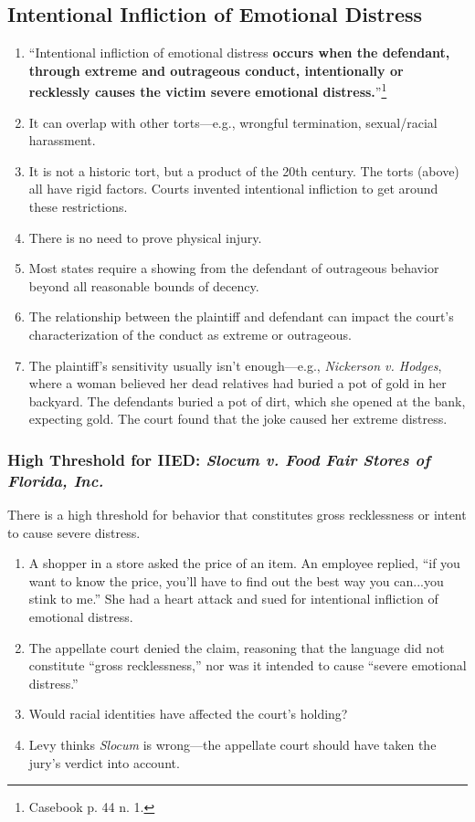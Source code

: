 \subsection{Intentional Infliction of Emotional Distress}

\begin{enumerate}
    \item ``Intentional infliction of emotional distress \textbf{occurs when 
    the defendant, through extreme and outrageous conduct, intentionally or 
    recklessly causes the victim severe emotional 
    distress.}''\footnote{Casebook p. 44 n. 1.}
    \item It can overlap with other torts---e.g., wrongful termination, 
    sexual/racial harassment.
    \item It is not a historic tort, but a product of the 20th century. The 
    torts (above) all have rigid factors. Courts invented intentional 
    infliction to get around these restrictions.
    \item There is no need to prove physical injury. %
    \item Most states require a showing from the defendant of outrageous 
    behavior beyond all reasonable bounds of decency.
    \item The relationship between the plaintiff and defendant can impact the 
    court's characterization of the conduct as extreme or outrageous.
    \item The plaintiff's sensitivity usually isn't enough---e.g., 
    \emph{Nickerson v. Hodges}, where a woman believed her dead relatives had 
    buried a pot of gold in her backyard. The defendants buried a pot of dirt, 
    which she opened at the bank, expecting gold. The court found that the 
    joke caused her extreme distress.
\end{enumerate}

\subsubsection{High Threshold for IIED: \emph{Slocum v. Food Fair Stores of 
Florida, Inc.}}

There is a high threshold for behavior that constitutes gross recklessness or 
intent to cause severe distress.

\begin{enumerate}
    \item A shopper in a store asked the price of an item. An employee replied, ``if 
    you want to know the price, you'll have to find out the best way you 
    can...you stink to me.'' She had a heart attack and sued for intentional 
    infliction of emotional distress.
    \item The appellate court denied the claim, reasoning that the language did not 
    constitute ``gross recklessness,'' nor was it intended to cause ``severe 
    emotional distress.''
    \item Would racial identities have affected the court's holding?
    \item Levy thinks \emph{Slocum} is wrong---the appellate court should have 
    taken the jury's verdict into account.
\end{enumerate}

